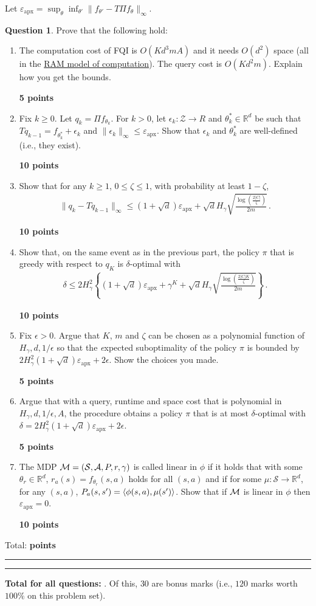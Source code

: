 \documentclass{article}
\newcommand{\norm}[1]{\| #1 \|}
\newcommand{\R}{\mathbb{R}}
\newcommand{\cZ}{\mathcal{Z}}
\DeclareMathOperator*{\1}{\mathbbm{1}}
\newcommand{\0}{\mathbf{0}}
\newcounter{DocPoints}
\newcounter{QuestionPoints}
\newcommand{\points}[1]{	\par\mbox{}\par\noindent\hfill {\bf #1 points}	\addtocounter{DocPoints}{#1}
	\addtocounter{QuestionPoints}{#1}
}
\newcommand{\tpoints}[1]{        	\ifthenelse{\isempty{#1}}	{	}	{		\addtocounter{DocPoints}{#1}
		\addtocounter{QuestionPoints}{#1}
	}													 	\par\mbox{}\par\noindent\hfill {Total: \bf \arabic{QuestionPoints}\xspace points}\par\mbox{}\par\hrule\hrule
	\setcounter{QuestionPoints}{0}
}
\theoremstyle{definition}
\newtheorem{question}{Question}
\theoremstyle{remark}
\theoremstyle{theorem}
\newcommand{\cS}{\mathcal{S}}
\newcommand{\cA}{\mathcal{A}}
\begin{document}
\newcommand{\epx}{\varepsilon_{\textrm{apx}}}
Let $\epx = \sup_{\theta} \inf_{\theta'} \norm{  f_{\theta'} - T \Pi f_{\theta} }_\infty$.
\begin{question}
Prove that the following hold:
\begin{enumerate}
\item The computation cost of FQI is $O(K d^3 m A)$ and it needs $O(d^2)$ space (all in the \href{https://en.wikipedia.org/wiki/Random-access_machine}{RAM model of computation}). The query cost is $O(K d^2 m)$. Explain how you get the bounds.
\points{5}
\item Fix $k\ge 0$. 
Let $q_k = \Pi f_{\theta_k}$. For $k>0$, let $\epsilon_k:\cZ \to R$ and $\theta_k^*\in \R^d$ 
be such that 
$T q_{k-1}= f_{\theta_k^*}+\epsilon_k$ 
and $\norm{\epsilon_k}_\infty \le \epx$. Show that $\epsilon_k$ and $\theta_k^*$ are well-defined (i.e., they exist).
\points{10}
\item Show that for any  $k\ge 1$, $0\le \zeta\le 1$, with probability at least $1-\zeta$,
\begin{align*}
\norm{q_k - T q_{k-1}}_\infty \le (1+\sqrt{d}) \epx + \sqrt{d} H_\gamma \sqrt{\frac{\log\left(\frac{2|C|}{\zeta}\right)}{2m}}\,.
\end{align*}
\points{10}
\item Show that, on the same event as in the previous part, the policy $\pi$ that is greedy with respect to $q_K$ is $\delta$-optimal with 
\begin{align*}
\delta \le 2 H_\gamma^2
\left\{
(1+\sqrt{d}) \epx +
 \gamma^K 
+ \sqrt{d} H_\gamma \sqrt{\frac{\log\left(\frac{2|C| K}{\zeta}\right)}{2m}} \right\}\,.
\end{align*}
\points{10}
\item 
Fix $\epsilon>0$.
Argue that $K$, $m$ and $\zeta$ can be chosen
as a polynomial function of $H_\gamma,d, 1/\epsilon$
so that the {\emph expected} suboptimality of the policy $\pi$ is bounded by
$2H_\gamma^2 (1+\sqrt{d})\epx + 2\epsilon$.  Show the choices you made.
\points{5}
\item Argue that with a query, runtime and space cost that is polynomial in $H_\gamma,d, 1/\epsilon,A$, 
the procedure obtains a policy $\pi$ that is at most $\delta$-optimal with
$\delta=2H_\gamma^2 (1+\sqrt{d})\epx + 2\epsilon$.
\points{5}
\item The MDP $\cM = (\cS,\cA,P,r,\gamma)$ is called linear in $\phi$ if it holds that with some $\theta_r\in \R^d$, $r_a(s) = f_{\theta_r}(s,a)$ holds for all $(s,a)$ and if for some $\mu:\cS \to \R^d$, 
 for any $(s,a)$,
$P_a(s,s') = \langle \phi(s,a), \mu(s') \rangle$. Show that if $\mathcal{M}$ is linear in $\phi$ then $\epx = 0$.
\points{10}
\end{enumerate}
\tpoints{}
\end{question}





\bigskip
\bigskip

\noindent
\textbf{
Total for all questions: }.
Of this, $30$ are bonus marks (i.e., $120$ marks worth $100\%$ on this problem set).
\end{document}
